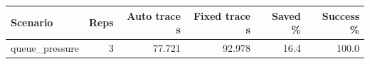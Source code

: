 \begin{tabular}{lrrrrr}
\hline
Scenario & Reps & Auto trace s & Fixed trace s & Saved \% & Success \% \\
\hline
queue_pressure & 3 & 77.721 & 92.978 & 16.4 & 100.0 \\
\hline
\end{tabular}
